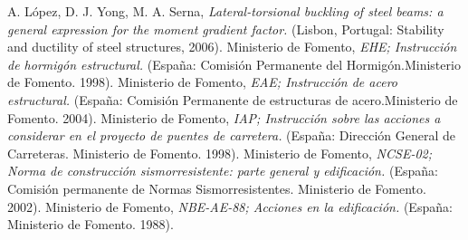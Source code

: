


 A. López, D. J. Yong, M. A. Serna,
{\it Lateral-torsional buckling of steel beams: a general expression for the moment gradient factor.} (Lisbon, Portugal: Stability and ductility of steel structures, 2006).
 Ministerio de Fomento,
{\it EHE; Instrucción de hormigón estructural.} (España: Comisión Permanente del Hormigón.Ministerio de Fomento. 1998).
 Ministerio de Fomento,
{\it EAE; Instrucción de acero estructural.} (España: Comisión Permanente de estructuras de acero.Ministerio de Fomento. 2004).
 Ministerio de Fomento,
{\it IAP; Instrucción sobre las acciones a considerar en el proyecto de puentes de carretera.} (España: Dirección General de Carreteras. Ministerio de Fomento. 1998).
 Ministerio de Fomento,
{\it NCSE-02; Norma de construcción sismorresistente: parte general y edificación.} (España: Comisión permanente de Normas Sismorresistentes. Ministerio de Fomento. 2002).
 Ministerio de Fomento,
{\it NBE-AE-88; Acciones en la edificación.} (España: Ministerio de Fomento. 1988).
